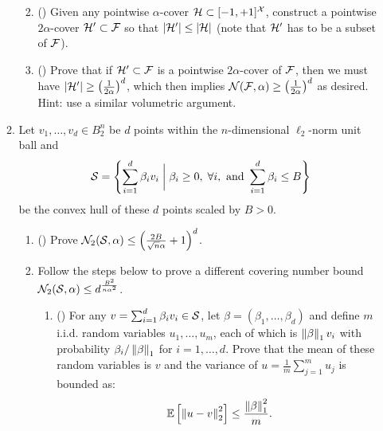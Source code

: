 \documentclass{article}
\begin{document}
\begin{enumerate}[leftmargin=*,align=left]
\begin{enumerate}[leftmargin=*,align=left]
\begin{enumerate}[leftmargin=*,align=left]
\vspace{5pt}
\item () 
Given any pointwise $\alpha$-cover ${\mathcal{H}} \subset [-1,+1]^{\mathcal{X}}$,
construct a pointwise $2\alpha$-cover ${\mathcal{H}}' \subset {\mathcal{F}}$ so that $|{\mathcal{H}}'| \leq |{\mathcal{H}}|$ (note that ${\mathcal{H}}'$ has to be a subset of ${\mathcal{F}}$). \\


\vspace{5pt}
\item () 
Prove that if ${\mathcal{H}}' \subset {\mathcal{F}}$ is a pointwise $2\alpha$-cover of ${\mathcal{F}}$, then we must have $|{\mathcal{H}}'| \geq \left(\frac{1}{2\alpha}\right)^d$, which then implies ${\mathcal{N}}({\mathcal{F}}, \alpha) \geq \left(\frac{1}{2\alpha}\right)^d$ as desired.  Hint: use a similar volumetric argument.\\


\end{enumerate}

\newpage
\item Let $v_1, \ldots, v_d \in B_2^n$ be $d$ points within the $n$-dimensional $\ell_2$-norm unit ball and 
\[
{\mathcal{S}} = \left\{\sum_{i=1}^d \beta_i v_i \;\bigg\rvert\; \beta_i \geq 0, \;\forall i, \text{ and }\sum_{i=1}^d \beta_i \leq B \right\}
\] 
be the convex hull of these $d$ points scaled by $B > 0$.

\begin{enumerate}[leftmargin=*,align=left]
\vspace{5pt}
\item () 
Prove ${\mathcal{N}}_2({\mathcal{S}}, \alpha) \leq \left(\frac{2B}{\sqrt{n}\alpha}+1\right)^d$. \\


\newpage
\vspace{5pt}
\item Follow the steps below to prove a different covering number bound ${\mathcal{N}}_2({\mathcal{S}}, \alpha) \leq d^{\frac{B^2}{n\alpha^2}}$.


\begin{enumerate}[leftmargin=*,align=left]
\vspace{5pt}
\item () 
For any $v = \sum_{i=1}^d \beta_i v_i \in {\mathcal{S}}$, let $\beta = (\beta_1, \ldots, \beta_d)$ and define $m$ i.i.d. random variables $u_1, \ldots, u_m$, each of which is $\left\|{\beta}\right\|_1 v_i$ with probability $\beta_i / \left\|{\beta}\right\|_1$ for $i = 1, \ldots, d$.
Prove that the mean of these random variables is $v$ and the variance of $u = \frac{1}{m} \sum_{j=1}^m u_j$ is bounded as:
\[
\mathbb{E}\left[\left\|{u - v}\right\|_2^2\right] \leq \frac{\left\|{\beta}\right\|_1^2}{m}.
\]



\end{enumerate}
\end{enumerate}
\end{enumerate}
\end{enumerate}
\end{document}

